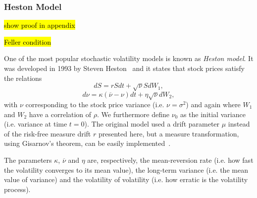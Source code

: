 \subsubsection{Heston Model}
\hl{show proof in appendix}

\hl{Feller condition}

One of the most popular stochastic volatility models is known as \emph{Heston model}. It was developed in 1993 by Steven Heston~\cite{Heston} and it states that stock prices satisfy the relations
\begin{equation}
dS=rSdt+\sqrt{\nu}SdW_1,
\end{equation}
\begin{equation}
d\nu=\kappa(\overline{\nu}-\nu)dt+\eta\sqrt{\nu}dW_2,
\end{equation}
\noindent with $\nu$ corresponding to the stock price variance (i.e. $\nu=\sigma^2$) and again where $W_1$ and $W_2$ have a correlation of $\rho$. We furthermore define $\nu_0$ as the initial variance (i.e. variance at time $t=0$). The original model used a drift parameter $\mu$ instead of the risk-free measure drift $r$ presented here, but a measure transformation, using Gisarnov's theorem, can be easily implemented~\cite{Crisostomo}.

The parameters $\kappa$, $\overline{\nu}$ and $\eta$ are, respectively, the mean-reversion rate (i.e. how fast the volatility converges to its mean value), the long-term variance (i.e. the mean value of variance) and the volatility of volatility (i.e. how erratic is the volatility process).



